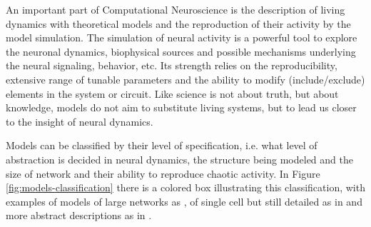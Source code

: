 An important part of Computational Neuroscience is the description of living dynamics with theoretical models and the reproduction of their activity by the model simulation. The simulation of neural activity is a powerful tool to explore the neuronal dynamics, biophysical sources and possible mechanisms underlying the neural signaling, behavior, etc. Its strength relies on the reproducibility, extensive range of tunable parameters and the ability to modify (include/exclude) elements in the system or circuit. Like science is not about truth, but about knowledge, models do not aim to substitute living systems, but to lead us closer to the insight of neural dynamics. %

Models can be classified by their level of specification, i.e. what level of abstraction is decided in neural dynamics, the structure being modeled and the size of network and their ability to reproduce chaotic activity. In Figure \ref{fig:models-classification} there is a colored box illustrating this classification, with examples of models of large networks as \cite{potjans2014,bezaire2016}, of single cell but still detailed as in \cite{smith2013} and more abstract descriptions as in \cite{izhikevich}.


